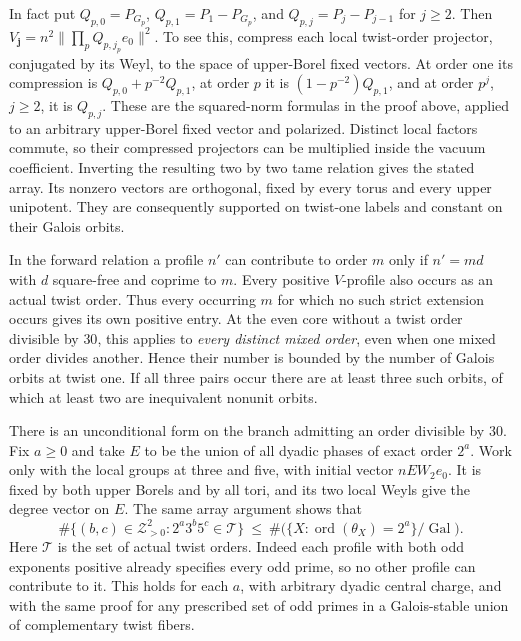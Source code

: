 \documentclass[11pt,a4paper]{article}
\numberwithin{equation}{section}
\theoremstyle{remark}
\newcommand{\Z}{\mathcal Z}
\DeclareMathOperator{\ord}{ord}
\begin{document}
In fact put $Q_{p,0}=P_{G_p}$, $Q_{p,1}=P_1-P_{G_p}$, and
$Q_{p,j}=P_j-P_{j-1}$ for $j\ge2$. Then
$V_{\boldsymbol j}=n^2\|\prod_p Q_{p,j_p}e_0\|^2$.
To see this, compress each local twist-order projector, conjugated
by its Weyl, to the space of upper-Borel fixed vectors. At order
one its compression is $Q_{p,0}+p^{-2}Q_{p,1}$, at order $p$ it
is $(1-p^{-2})Q_{p,1}$, and at order $p^j$, $j\ge2$, it is
$Q_{p,j}$. These are the squared-norm formulas in the proof above,
applied to an arbitrary upper-Borel fixed vector and polarized.
Distinct local factors commute, so their compressed projectors can
be multiplied inside the vacuum coefficient. Inverting the resulting
two by two tame relation gives the stated array. Its nonzero vectors
are orthogonal, fixed by every torus and every upper unipotent. They
are consequently supported on twist-one labels and constant on
their Galois orbits.

In the forward relation a profile $n'$ can contribute to order $m$
only if $n'=md$ with $d$ square-free and coprime to $m$. Every positive
$V$-profile also occurs as an actual twist order. Thus every occurring
$m$ for which no such strict extension occurs gives its own positive
entry. At the even core without a twist order divisible by $30$, this
applies to \emph{every distinct mixed order}, even when one mixed order
divides another. Hence their number is bounded by the number of
Galois orbits at twist one. If all three pairs occur there are at least
three such orbits, of which at least two are inequivalent nonunit orbits.

There is an unconditional form on the branch admitting an order
divisible by $30$. Fix $a\ge0$ and take $E$ to be the union of
all dyadic phases of exact order $2^a$. Work only with the local
groups at three and five, with initial vector $n E W_2e_0$.
It is fixed by both upper Borels and by all tori, and its two
local Weyls give the degree vector on $E$. The same array argument
shows that
\[
 \#\{(b,c)\in\Z_{>0}^2:2^a3^b5^c\in\mathcal T\}
\ \le\ \#\bigl(\{X:\ord(\theta_X)=2^a\}/\operatorname{Gal}\bigr).
\]
Here $\mathcal T$ is the set of actual twist orders. Indeed each profile with both odd exponents positive already specifies
every odd prime, so no other profile can contribute to it.
This holds for each $a$, with arbitrary dyadic central charge, and
with the same proof for any prescribed set of odd primes in a
Galois-stable union of complementary twist fibers.
\end{document}
